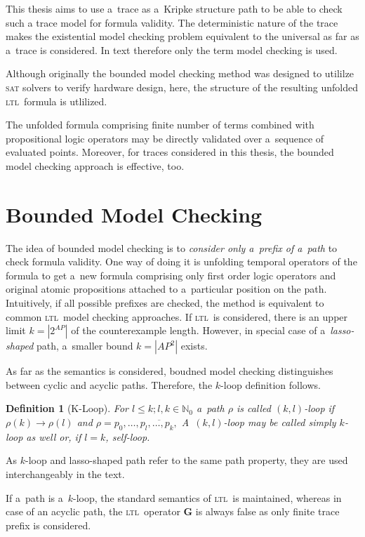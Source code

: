 \documentclass[12pt,oneside,draft]{fithesis}
\newcommand{\ltl}{\textsc{ltl}~}
\newcommand{\mNatural}{\mathbb{N}}
\newcommand{\bG}{\mathbf{G}}
\newtheorem{mydef}{Definition}
\begin{document}
This thesis aims to use a~trace as a~Kripke structure path to be able
to check such a trace model for formula validity. The deterministic
nature of the trace makes the existential model checking problem
equivalent to the universal as far as a~trace is considered.
In text therefore only the term model checking is used.

Although originally\cite{biere} the bounded model checking method was
designed to utililze \textsc{sat} solvers to verify hardware design,
here, the structure of the resulting unfolded \ltl formula is utlilized.

The unfolded formula comprising finite number of terms combined with
propositional logic operators may be directly validated over a~sequence
of evaluated points. Moreover, for traces considered in this thesis,
the bounded model checking approach is effective, too.

\section{Bounded Model Checking}
The idea of bounded model checking is to \emph{consider only a~prefix
of a~path} to check formula validity. One way of doing it is unfolding
temporal operators of the formula to get a~new formula comprising only
first order logic operators and original atomic propositions attached
to a~particular position on the path. Intuitively, if all possible
prefixes are checked, the method is equivalent to common \ltl model
checking approaches. If \ltl is considered, there is an upper
limit $k=|2^{AP}|$ of the counterexample length\cite{biere}. However, in
special case of a~\emph{lasso-shaped} path, a~smaller bound $k=|AP^2|$
exists\cite{biere}.

As far as the semantics is considered, boudned model checking
distinguishes between cyclic and acyclic paths. Therefore, the $k$-loop
definition follows.
\begin{mydef}[K-Loop]
For $l\leq k;l,k\in\mNatural_0$ a~path $\rho$ is called $(k,l)$-loop
if $\rho(k)\rightarrow\rho(l)$ and
$\rho=p_0,\dotsc,\overline{p_{l},\dotsc,p_{k},}$
A~$(k,l)$-loop may be called simply $k$-loop as well or, if $l=k$,
self-loop.
\end{mydef}
As $k$-loop and lasso-shaped path refer to the same path property, they
are used interchangeably in the text.

If a~path is a~$k$-loop, the standard semantics of \ltl is maintained,
whereas in case of an acyclic path, the \ltl operator $\bG$ is always
false as only finite trace prefix is considered.
\end{document}
